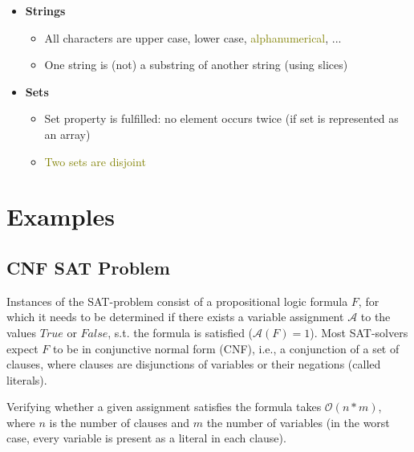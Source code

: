 \documentclass{article}
\begin{document}
\begin{itemize}
\begin{itemize}
    \end{itemize}
    \item \textbf{Strings}
    \begin{itemize}
        \item All characters are upper case, lower case, \textcolor{olive}{alphanumerical}, ...
        \item One string is (not) a substring of another string (using slices)
    \end{itemize}
    \item \textbf{Sets}
    \begin{itemize}
        \item Set property is fulfilled: no element occurs twice (if set is represented as an array)
        \item \textcolor{olive}{Two sets are disjoint}
    \end{itemize}
\end{itemize}

\section{Examples}\label{sec:examples}

\subsection{CNF SAT Problem}\label{subsec:cnfsat}
Instances of the SAT-problem consist of a propositional logic formula $F$, for which it needs to be determined if there exists a variable assignment $\mathcal{A}$ to the values $True$ or $False$, s.t. the formula is satisfied ($\mathcal{A}(F) = 1$). Most SAT-solvers expect $F$ to be in conjunctive normal form (CNF), i.e., a conjunction of a set of clauses, where clauses are disjunctions of variables or their negations (called literals).

Verifying whether a given assignment satisfies the formula takes $\mathcal{O}(n*m)$, where $n$ is the number of clauses and $m$ the number of variables (in the worst case, every variable is present as a literal in each clause).
\end{document}
